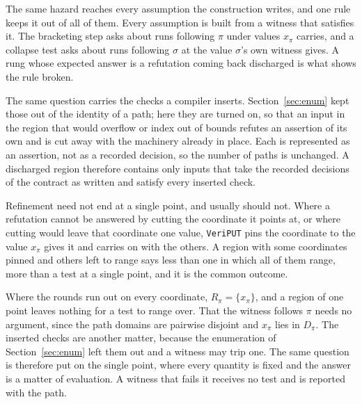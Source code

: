 \documentclass[manuscript,anonymous]{acmart}
\newcommand{\tool}[1]{\texttt{#1}}
\begin{document}
The same hazard reaches every assumption the construction writes, and one rule
keeps it out of all of them. Every assumption is built from a witness that
satisfies it. The bracketing step asks about runs following $\pi$ under values
$x_\pi$ carries, and a collapse test asks about runs following $\sigma$ at the
value $\sigma$'s own witness gives. A rung whose expected answer is a refutation
coming back discharged is what shows the rule broken.

The same question carries the checks a compiler inserts. Section~\ref{sec:enum}
kept those out of the identity of a path; here they are turned on, so that an
input in the region that would overflow or index out of bounds refutes an
assertion of its own and is cut away with the machinery already in place. Each
is represented as an assertion, not as a recorded decision, so the number
of paths is unchanged. A discharged region therefore contains only inputs that
take the recorded decisions of the contract as written and satisfy every
inserted check.

Refinement need not end at a single point, and usually should not. Where a
refutation cannot be answered by cutting the coordinate it points at, or where
cutting would leave that coordinate one value, \tool{VeriPUT} pins the
coordinate to the value $x_\pi$ gives it and carries on with the others. A region
with some coordinates pinned and others left to range says less than one in which
all of them range, more than a test at a single point, and it is the common
outcome.

Where the rounds run out on every coordinate, $R_\pi = \{x_\pi\}$, and a region
of one point leaves nothing for a test to range over. That the witness
follows $\pi$ needs no argument, since the path domains are pairwise disjoint
and $x_\pi$ lies in $D_\pi$. The inserted checks are another matter, because the
enumeration of Section~\ref{sec:enum} left them out and a witness may trip one.
The same question is therefore put on the single point, where every quantity is
fixed and the answer is a matter of evaluation. A witness that fails it receives
no test and is reported with the path.
\end{document}
